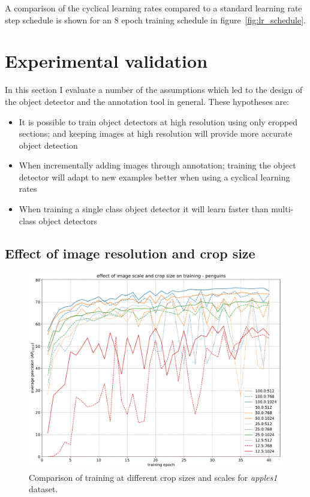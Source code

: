 A comparison of the cyclical learning rates compared to a standard learning rate step schedule is shown for an $8$ epoch training schedule in figure~\ref{fig:lr_schedule}.

\section {Experimental validation}

In this section I evaluate a number of the assumptions which led to the design of the object detector and the annotation tool in general. These hypotheses are:

\begin{itemize}
    \item {It is possible to train object detectors at high resolution using only cropped sections; and keeping images at high resolution will provide more accurate object detection}
    \item {When incrementally adding images through annotation; training the object detector will adapt to new examples better when using a cyclical learning rates}    
    \item {When training a single class object detector it will learn faster than multi-class object detectors}
\end{itemize} 


\subsection {Effect of image resolution and crop size}
\label{sec:scale_crop}


\begin{figure}[h]
  \centering
  \includegraphics[width=1.0\linewidth]{charts/training/crops_scales/penguins.pdf}
  \caption{Comparison of training at different crop sizes and scales for \emph{apples1} dataset. }  
  \label{fig:apples_crop_scale}
\end{figure}

